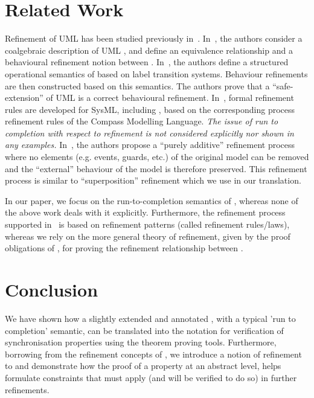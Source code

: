 
\section{Related Work} 
\label{sec:related}
Refinement of UML \statecharts has been  studied previously in~\cite{MeNaBa04,SzVi10,MiCa14,HaSyLu15,LiMiCaCoTySaHaLaLe17}. 
In~\cite{MeNaBa04}, the authors consider a coalgebraic description of UML \statecharts, and define an equivalence relationship and a behavioural refinement notion between \statecharts. 
In~\cite{SzVi10}, the authors define a structured operational semantics of \statecharts based on label transition systems.  
Behaviour refinements are then constructed based on this semantics. 
The authors prove that a ``safe-extension'' of UML \statecharts is a correct behavioural refinement.
In~\cite{MiCa14,LiMiCaCoTySaHaLaLe17}, formal refinement rules are developed for SysML, including \statecharts, based on the corresponding process refinement rules of the Compass Modelling Language. 
\emph{The issue of run to completion with respect to refinement is not considered explicitly  nor shown in any examples.}
In~\cite{HaSyLu15}, the authors propose  a ``purely additive'' refinement process where no elements (e.g. events, guards, etc.) of the original model can be removed and the ``external'' behaviour of the model is therefore preserved.  
This refinement process is similar to \EventB ``superposition'' refinement which we use in our translation.  

In our paper, we focus on the run-to-completion semantics of \statecharts, whereas none of the above work deals with it explicitly. 
Furthermore, the refinement process supported in~\cite{MeNaBa04,MiCa14,HaSyLu15,LiMiCaCoTySaHaLaLe17} is based on refinement patterns (called refinement rules/laws), whereas we rely on the more general theory of refinement, given by the proof obligations of \EventB, for proving the refinement relationship between \statecharts.

\section{Conclusion}
\label{sec:conclusion}
We have shown how a slightly extended and annotated \statechart, with a typical 'run to completion' semantic, can be translated into the \EventB notation for verification of synchronisation properties using the \EventB theorem proving tools.
Furthermore, borrowing from the refinement concepts of \EventB, we introduce a notion of refinement to \statecharts and demonstrate how the proof of a property at an abstract level, helps formulate constraints that must apply (and will be verified to do so) in further refinements.


